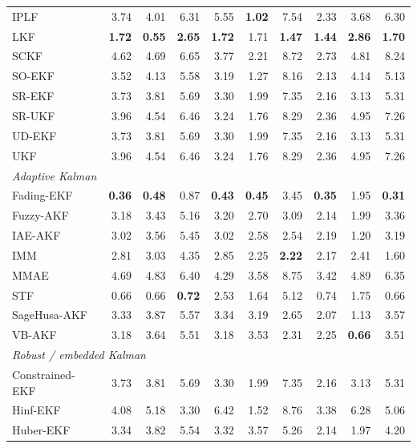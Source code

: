 \begin{longtable}{lrrrrrrrrr}
\quad IPLF & 3.74 & 4.01 & 6.31 & 5.55 & \textbf{1.02} & 7.54 & 2.33 & 3.68 & 6.30 \\
\quad LKF & \textbf{1.72} & \textbf{0.55} & \textbf{2.65} & \textbf{1.72} & 1.71 & \textbf{1.47} & \textbf{1.44} & \textbf{2.86} & \textbf{1.70} \\
\quad SCKF & 4.62 & 4.69 & 6.65 & 3.77 & 2.21 & 8.72 & 2.73 & 4.81 & 8.24 \\
\quad SO-EKF & 3.52 & 4.13 & 5.58 & 3.19 & 1.27 & 8.16 & 2.13 & 4.14 & 5.13 \\
\quad SR-EKF & 3.73 & 3.81 & 5.69 & 3.30 & 1.99 & 7.35 & 2.16 & 3.13 & 5.31 \\
\quad SR-UKF & 3.96 & 4.54 & 6.46 & 3.24 & 1.76 & 8.29 & 2.36 & 4.95 & 7.26 \\
\quad UD-EKF & 3.73 & 3.81 & 5.69 & 3.30 & 1.99 & 7.35 & 2.16 & 3.13 & 5.31 \\
\quad UKF & 3.96 & 4.54 & 6.46 & 3.24 & 1.76 & 8.29 & 2.36 & 4.95 & 7.26 \\
\multicolumn{10}{l}{\textit{Adaptive Kalman}} \\
\quad Fading-EKF & \textbf{0.36} & \textbf{0.48} & 0.87 & \textbf{0.43} & \textbf{0.45} & 3.45 & \textbf{0.35} & 1.95 & \textbf{0.31} \\
\quad Fuzzy-AKF & 3.18 & 3.43 & 5.16 & 3.20 & 2.70 & 3.09 & 2.14 & 1.99 & 3.36 \\
\quad IAE-AKF & 3.02 & 3.56 & 5.45 & 3.02 & 2.58 & 2.54 & 2.19 & 1.20 & 3.19 \\
\quad IMM & 2.81 & 3.03 & 4.35 & 2.85 & 2.25 & \textbf{2.22} & 2.17 & 2.41 & 1.60 \\
\quad MMAE & 4.69 & 4.83 & 6.40 & 4.29 & 3.58 & 8.75 & 3.42 & 4.89 & 6.35 \\
\quad STF & 0.66 & 0.66 & \textbf{0.72} & 2.53 & 1.64 & 5.12 & 0.74 & 1.75 & 0.66 \\
\quad SageHusa-AKF & 3.33 & 3.87 & 5.57 & 3.34 & 3.19 & 2.65 & 2.07 & 1.13 & 3.57 \\
\quad VB-AKF & 3.18 & 3.64 & 5.51 & 3.18 & 3.53 & 2.31 & 2.25 & \textbf{0.66} & 3.51 \\
\multicolumn{10}{l}{\textit{Robust / embedded Kalman}} \\
\quad Constrained-EKF & 3.73 & 3.81 & 5.69 & 3.30 & 1.99 & 7.35 & 2.16 & 3.13 & 5.31 \\
\quad Hinf-EKF & 4.08 & 5.18 & 3.30 & 6.42 & 1.52 & 8.76 & 3.38 & 6.28 & 5.06 \\
\quad Huber-EKF & 3.34 & 3.82 & 5.54 & 3.32 & 3.57 & 5.26 & 2.14 & 1.97 & 4.20 \\

\end{longtable}
